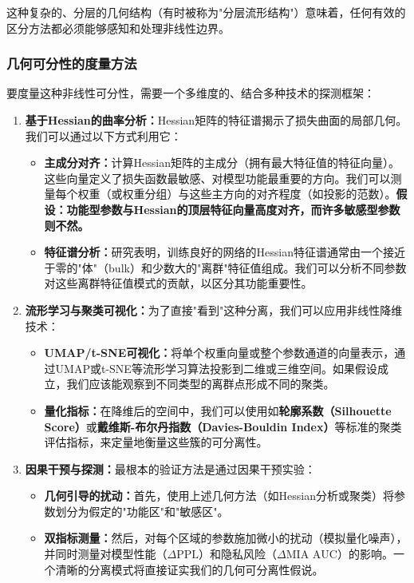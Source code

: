 \documentclass[letterpaper,twocolumn,10pt]{article}
\begin{document}
这种复杂的、分层的几何结构（有时被称为"分层流形结构"）意味着，任何有效的区分方法都必须能够感知和处理非线性边界。

\subsubsection{几何可分性的度量方法}

要度量这种非线性可分性，需要一个多维度的、结合多种技术的探测框架：

\begin{enumerate}
\item \textbf{基于Hessian的曲率分析：}Hessian矩阵的特征谱揭示了损失曲面的局部几何。我们可以通过以下方式利用它：
\begin{itemize}
\item \textbf{主成分对齐：}计算Hessian矩阵的主成分（拥有最大特征值的特征向量）。这些向量定义了损失函数最敏感、对模型功能最重要的方向。我们可以测量每个权重（或权重分组）与这些主方向的对齐程度（如投影的范数）。\textbf{假设：功能型参数与Hessian的顶层特征向量高度对齐，而许多敏感型参数则不然。}

\item \textbf{特征谱分析：}研究表明，训练良好的网络的Hessian特征谱通常由一个接近于零的"体"（bulk）和少数大的"离群"特征值组成。我们可以分析不同参数对这些离群特征值模式的贡献，以区分其功能重要性。
\end{itemize}

\item \textbf{流形学习与聚类可视化：}为了直接"看到"这种分离，我们可以应用非线性降维技术：
\begin{itemize}
\item \textbf{UMAP/t-SNE可视化：}将单个权重向量或整个参数通道的向量表示，通过UMAP或t-SNE等流形学习算法投影到二维或三维空间。如果假设成立，我们应该能观察到不同类型的离群点形成不同的聚类。

\item \textbf{量化指标：}在降维后的空间中，我们可以使用如\textbf{轮廓系数（Silhouette Score）}或\textbf{戴维斯-布尔丹指数（Davies-Bouldin Index）}等标准的聚类评估指标，来定量地衡量这些簇的可分离性。
\end{itemize}

\item \textbf{因果干预与探测：}最根本的验证方法是通过因果干预实验：
\begin{itemize}
\item \textbf{几何引导的扰动：}首先，使用上述几何方法（如Hessian分析或聚类）将参数划分为假定的"功能区"和"敏感区"。

\item \textbf{双指标测量：}然后，对每个区域的参数施加微小的扰动（模拟量化噪声），并同时测量对模型性能（$\Delta \text{PPL}$）和隐私风险（$\Delta \text{MIA AUC}$）的影响。一个清晰的分离模式将直接证实我们的几何可分离性假说。
\end{itemize}
\end{enumerate}
\end{document}
